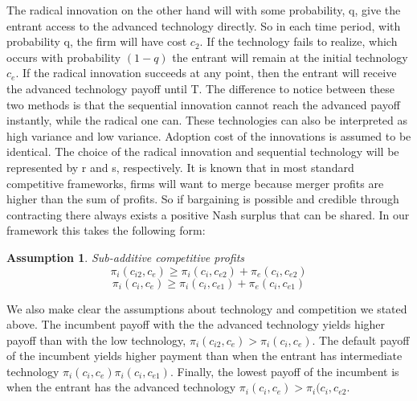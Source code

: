 \documentclass[12pt]{report}
\newtheorem{assumption}{Assumption}
\numberwithin{equation}{section}
\begin{document}
The radical innovation on the other hand will with some probability, q, give the entrant access to the advanced technology directly. So in each time period, with probability q, the firm will have cost $c_2$. If the technology fails to realize, which occurs with probability $(1-q)$ the entrant will remain at the initial technology $c_e$. If the radical innovation succeeds at any point, then the entrant will receive the advanced technology payoff until T. 
The difference to notice between these two methods is that the sequential innovation cannot reach the advanced payoff instantly, while the radical one can. These technologies can also be interpreted as high variance and low variance. Adoption cost of the innovations is assumed to be identical. The choice of the radical innovation and sequential technology will be represented by r and s, respectively.  
It is known that in most standard competitive frameworks, firms will want to merge because merger profits are higher than the sum of profits. So if bargaining is possible and credible through contracting there always exists a positive Nash surplus that can be shared. In our framework this takes the following form: 
\begin{assumption}{Sub-additive competitive profits}\label{as1}
\begin{equation*}
\pi_{i}(c_{i2},c_{e}) \geq  \pi_{i}(c_{i},c_{e2}) + \pi_{e}(c_{i},c_{e2})
\end{equation*}
\begin{equation*}
\pi_{i}(c_{i},c_{e}) \geq  \pi_{i}(c_{i},c_{e1}) + \pi_{e}(c_{i},c_{e1})
\end{equation*}
\end{assumption}
We also make clear the assumptions about technology and competition we stated above. The incumbent payoff with the the advanced technology yields higher payoff than with the low technology, $\pi_{i}(c_{i2},c_{e})>\pi_{i}(c_{i},c_{e})$. The default payoff of the incumbent yields higher payment than when the entrant has intermediate technology $\pi_{i}(c_{i},c_{e}) \pi_{i}(c_{i},c_{e1})$. Finally, the lowest payoff of the incumbent is when the entrant has the advanced technology $\pi_{i}(c_{i},c_{e})>\pi_{i}(c_{i},c_{e2}$. 
\end{document}
